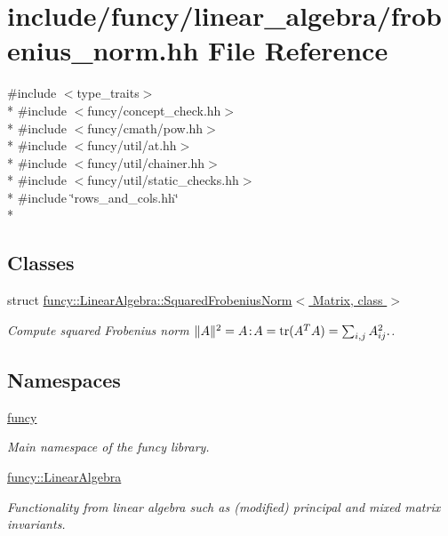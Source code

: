 \hypertarget{frobenius__norm_8hh}{\section{include/funcy/linear\-\_\-algebra/frobenius\-\_\-norm.hh File Reference}
\label{frobenius__norm_8hh}
}
{\ttfamily \#include $<$type\-\_\-traits$>$}\\*
{\ttfamily \#include $<$funcy/concept\-\_\-check.\-hh$>$}\\*
{\ttfamily \#include $<$funcy/cmath/pow.\-hh$>$}\\*
{\ttfamily \#include $<$funcy/util/at.\-hh$>$}\\*
{\ttfamily \#include $<$funcy/util/chainer.\-hh$>$}\\*
{\ttfamily \#include $<$funcy/util/static\-\_\-checks.\-hh$>$}\\*
{\ttfamily \#include \char`\"{}rows\-\_\-and\-\_\-cols.\-hh\char`\"{}}\\*
\subsection*{Classes}
\begin{DoxyCompactItemize}
\item 
struct \hyperlink{structfuncy_1_1LinearAlgebra_1_1SquaredFrobeniusNorm}{funcy\-::\-Linear\-Algebra\-::\-Squared\-Frobenius\-Norm$<$ Matrix, class $>$}
\begin{DoxyCompactList}\small\item\em Compute squared Frobenius norm $ \|A\|^2 = A\negthinspace : \negthinspace A = \mathrm{tr}(A^TA) = \sum_{i,j} A_{ij}^2. $. \end{DoxyCompactList}\end{DoxyCompactItemize}
\subsection*{Namespaces}
\begin{DoxyCompactItemize}
\item 
\hyperlink{namespacefuncy}{funcy}
\begin{DoxyCompactList}\small\item\em Main namespace of the funcy library. \end{DoxyCompactList}\item 
\hyperlink{namespacefuncy_1_1LinearAlgebra}{funcy\-::\-Linear\-Algebra}
\begin{DoxyCompactList}\small\item\em Functionality from linear algebra such as (modified) principal and mixed matrix invariants. \end{DoxyCompactList}\end{DoxyCompactItemize}

